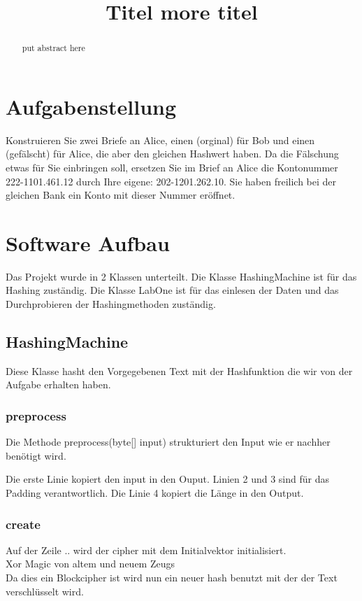 \documentclass[12pt]{scrartcl}
\title{ %
Titel
\vspace{0.2cm}
\Large more titel }
\begin{document}
 \maketitle
 \thispagestyle{firststyle}
 \pagestyle{firststyle}
 \begin{abstract}
 \begin{center}
  put abstract here  
 \end{center}
 \vspace{0.5cm}
\hrulefill
\end{abstract}

 \pagestyle{documentstyle}
 \tableofcontents
 \pagebreak
\section{Aufgabenstellung}
Konstruieren Sie zwei Briefe an Alice, einen (orginal) für Bob und einen (gefälscht) für Alice, die aber den gleichen Hashwert haben. Da die Fälschung etwas für Sie einbringen soll, ersetzen Sie im Brief an Alice die Kontonummer 222-1101.461.12 durch Ihre eigene: 202-1201.262.10. Sie haben freilich bei der gleichen Bank ein Konto mit dieser Nummer eröffnet.
\section{Software Aufbau}
Das Projekt wurde in 2 Klassen unterteilt. Die Klasse HashingMachine ist für das Hashing zuständig. Die Klasse LabOne ist für das einlesen der Daten und das Durchprobieren der Hashingmethoden zuständig.
\subsection{HashingMachine}
Diese Klasse hasht den Vorgegebenen Text mit der Hashfunktion die wir von der Aufgabe erhalten haben.
\subsubsection{preprocess}
Die Methode preprocess(byte[] input) strukturiert den Input wie er nachher benötigt wird.

Die erste Linie kopiert den input in den Ouput. Linien 2 und 3 sind für das Padding verantwortlich. Die Linie 4 kopiert die Länge in den Output.
\subsubsection{create}

Auf der Zeile .. wird der cipher mit dem Initialvektor initialisiert.\\
Xor Magic von altem und neuem Zeugs\\
Da dies ein Blockcipher ist wird nun ein neuer hash benutzt mit der der Text verschlüsselt wird.\\
\end{document}
